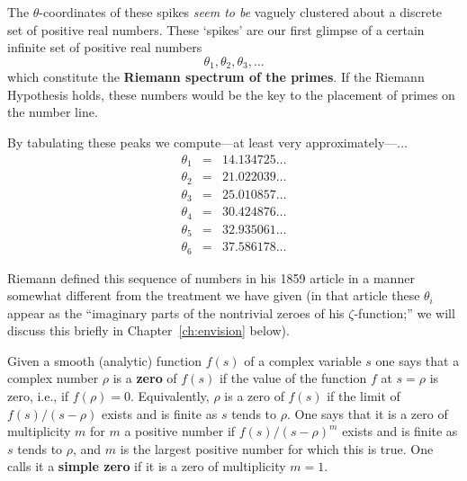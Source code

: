 \documentclass[openany]{book}
\newcommand{\ill}[3]{%
   \begin{figure}[H]%
   \vspace{-2ex}
   \centering%
   \texttt{[image: illustrations/\#1]}%
   \caption{#3}%
   \vspace{-2ex}
    \end{figure}}
\theoremstyle{plain}
\theoremstyle{definition}
\begin{document}
{{   %





The $\theta$-coordinates of these spikes  {\it seem to be}
vaguely clustered about a discrete set of positive real numbers.
These `spikes' are our first glimpse of a
certain infinite set of positive real numbers
 $$\theta_1,\theta_2,\theta_3,\dots$$ which constitute the {\bf Riemann spectrum of
  the primes}. If the Riemann Hypothesis holds, these numbers would
be the key to the placement of primes on the number line.








By tabulating these peaks we compute---at least very approximately---$\dots$
\begin{eqnarray*}
\theta_1 &=& 14.134725 \dots\\
\theta_2 &=& 21.022039 \dots\\
\theta_3 &=& 25.010857 \dots\\
\theta_4 &=& 30.424876 \dots\\
\theta_5 &=& 32.935061 \dots\\
\theta_6 &=& 37.586178 \dots
\end{eqnarray*}

Riemann defined this sequence of numbers in his 1859 article in a
manner somewhat different from the treatment we have given (in that
article these $\theta_i$ appear as the ``imaginary parts of the
nontrivial zeroes of his $\zeta$-function;'' we will discuss this
briefly in Chapter~\ref{ch:envision} below).

Given a smooth (analytic) function $f(s)$  of a complex variable $s$ one says that a complex number $\rho$ is a {\bf zero} of $f(s)$  if the value of the function $f$ at $s=\rho$ is zero, i.e., if $f(\rho)=0$. Equivalently, $\rho$ is a zero of $f(s)$ if the limit of $f(s)/(s-\rho)$ exists and is finite as $s$ tends to $\rho$.  One says that it is a zero of multiplicity $m$ for $m$ a positive number if $f(s)/(s-\rho)^m$ exists and is finite as $s$ tends to $\rho$, and $m$ is the largest positive number for which this is true. One calls it a {\bf simple zero} if it is a zero of multiplicity $m=1$.

}}
\end{document}
